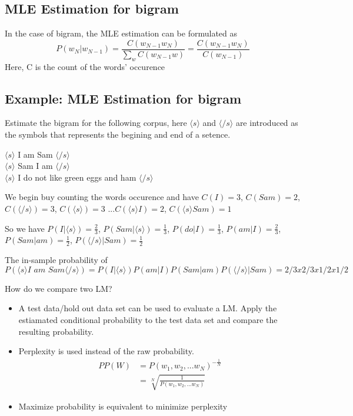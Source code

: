 \documentclass[12pt, oneside]{article}
\begin{document}
\subsection{MLE Estimation for bigram }
In the case of bigram, the MLE estimation can be formulated as 
$$
P(w_N|w_{N-1})=\frac{C(w_{N-1}w_N)}{\sum_{w}C(w_{N-1}w)}=\frac{C(w_{N-1}w_N)}{C(w_{N-1})}
$$
Here, C is the count of the words' occurence
\subsection{Example: MLE Estimation for bigram }
Estimate the bigram for the following corpus, here $\langle s \rangle$ and $\langle /s\rangle$ are introduced as the symbols that represents the begining and  end of a setence.

$\langle s \rangle$ I am Sam $\langle /s\rangle$\\
$\langle s \rangle$ Sam I am $\langle /s\rangle$\\
$\langle s \rangle$ I do not like green eggs and ham $\langle /s \rangle$

We begin buy counting the words occurence and have $C(I)=3$, $C(Sam)=2$, $C(\langle /s\rangle)=3$, $C(\langle s\rangle)=3$ ...$C(\langle s \rangle I)=2$, $C(\langle s \rangle Sam)=1$

\vspace{0.2cm}

So we have $P(I|\langle s \rangle)=\frac{2}{3}$, $P(Sam|\langle s \rangle)=\frac{1}{3}$, $P(do|I)=\frac{1}{3}$, $P(am|I)=\frac{2}{3}$, $P(Sam|am)=\frac{1}{2}$, $P(\langle /s\rangle | Sam)=\frac{1}{2}$

\vspace{0.2cm}

The in-sample probability of $P(\langle s \rangle \textit{I am Sam}\langle /s\rangle)=P(I|\langle s \rangle)P(am|I)P(Sam|am)P(\langle /s\rangle | Sam)=2/3x2/3x1/2x1/2$


How do we compare two LM?
\begin{itemize}
\item A test data/hold out data set can be used to evaluate a LM. Apply the estiamated conditional probability to the test data set and compare the resulting probability.
\item Perplexity is used instead of the raw probability. 
\begin{align*}
	PP(W)&=P(w_1, w_2, ...w_N)^{-\frac{1}{N}}\\
	&=\sqrt[N]{\frac{1}{P(w_1, w_2, ...w_N)}}
\end{align*}
\item Maximize probability is equivalent to minimize perplexity

\end{itemize}
\end{document}
